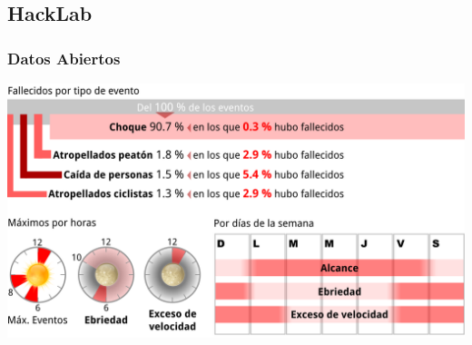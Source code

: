 \subsection{HackLab}
\begin{frame}
    \frametitle{Datos Abiertos}
    \includegraphics[width=\textwidth]{HackatonHallazgos.png}
\end{frame}

